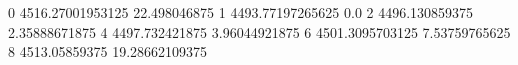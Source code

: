 0 4516.27001953125 22.498046875
1 4493.77197265625 0.0
2 4496.130859375 2.35888671875
4 4497.732421875 3.96044921875
6 4501.3095703125 7.53759765625
8 4513.05859375 19.28662109375
